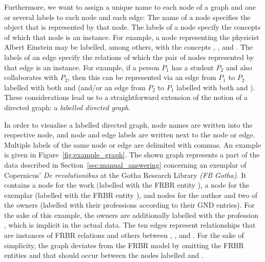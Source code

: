 Furthermore, we want to assign a unique name to each node of a graph
and one or several labels to each node and each edge:
The name of a node specifies the object that is represented by that node.
The labels of a node specify the concepts
of which that node is an instance.
For example, a node representing the physicist Albert Einstein
may be labelled, among others, with the concepts , ,
and .
The labels of an edge specify the relations of which the pair of nodes
represented by that edge is an instance.
For example, if a person $P_1$ has a student $P_2$ and also 
collaborates with $P_2$, then this can be represented via an edge from $P_1$ to $P_2$
labelled with both  and 
(and/or an edge from $P_2$ to $P_1$ labelled with both  and ).
These considerations lead us to a straightforward extension
of the notion of a directed graph:
a \emph{labelled directed graph}.

In order to visualise a labelled directed graph,
node names are written into the respective node,
and node and edge labels are written next to the node or edge.
Multiple labels of the same node or edge are delimited with commas.
An example is given in Figure~\ref{fig:example_graph}.
The shown graph represents a part of the data described in Section~\ref{sec:manual_answering}
concerning an exemplar of Copernicus' \emph{De revolutionibus} at the
Gotha Research Library \emph{(FB Gotha)}.
It contains a node for the work (labelled with the \gls{FRBR} entity ),
a node for the exemplar (labelled with the \gls{FRBR} entity ),
and nodes for the author and two of the owners (labelled with their professions according to their \gls{GND} entries).
For the sake of this example, the owners are additionally labelled with the profession
, which is implicit in the actual data.
The ten edges represent relationships that are instances
of \gls{FRBR} relations and others between , , and .
For the sake of simplicity, the graph deviates from the \gls{FRBR} model \autocite{FRBR1998}
by omitting the \gls{FRBR} entities  and 
that should occur between the nodes labelled  and .

